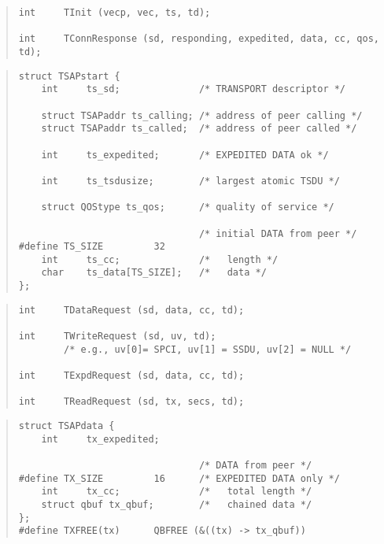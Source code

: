 \begin{bwslide}

\begin{quote}\small\begin{verbatim}
int     TInit (vecp, vec, ts, td);

int     TConnResponse (sd, responding, expedited, data, cc, qos, td);
\end{verbatim}\end{quote}
\end{bwslide}


\begin{bwslide}

\begin{quote}\small\begin{verbatim}
struct TSAPstart {
    int     ts_sd;              /* TRANSPORT descriptor */

    struct TSAPaddr ts_calling; /* address of peer calling */
    struct TSAPaddr ts_called;  /* address of peer called */

    int     ts_expedited;       /* EXPEDITED DATA ok */

    int     ts_tsdusize;        /* largest atomic TSDU */

    struct QOStype ts_qos;      /* quality of service */

                                /* initial DATA from peer */
#define TS_SIZE         32
    int     ts_cc;              /*   length */
    char    ts_data[TS_SIZE];   /*   data */
};
\end{verbatim}\end{quote}
\end{bwslide}


\begin{bwslide}

\begin{quote}\small\begin{verbatim}
int     TDataRequest (sd, data, cc, td);

int     TWriteRequest (sd, uv, td);
        /* e.g., uv[0]= SPCI, uv[1] = SSDU, uv[2] = NULL */

int     TExpdRequest (sd, data, cc, td);

int     TReadRequest (sd, tx, secs, td);
\end{verbatim}\end{quote}
\end{bwslide}


\begin{bwslide}

\begin{quote}\small\begin{verbatim}
struct TSAPdata {
    int     tx_expedited;

                                /* DATA from peer */
#define TX_SIZE         16      /* EXPEDITED DATA only */
    int     tx_cc;              /*   total length */
    struct qbuf tx_qbuf;        /*   chained data */
};
#define TXFREE(tx)      QBFREE (&((tx) -> tx_qbuf))
\end{verbatim}\end{quote}
\end{bwslide}


